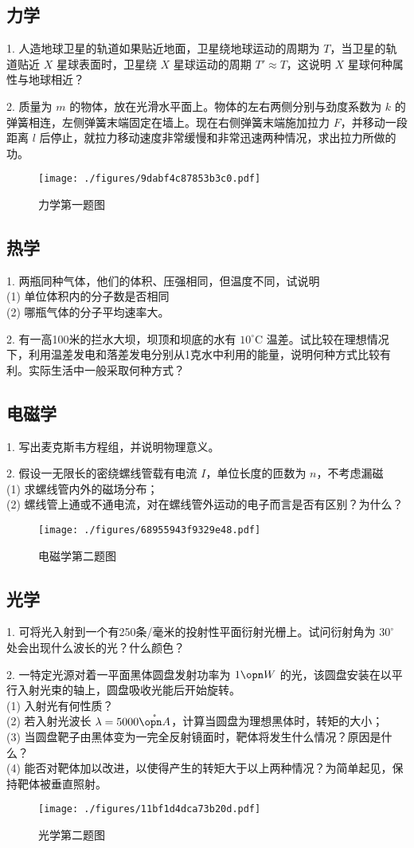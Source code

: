 \subsection{力学}
1. 人造地球卫星的轨道如果贴近地面，卫星绕地球运动的周期为 $T$，当卫星的轨道贴近 $X$ 星球表面时，卫星绕 $X$ 星球运动的周期 $T' \approx T$，这说明 $X$ 星球何种属性与地球相近？

2. 质量为 $m$ 的物体，放在光滑水平面上。物体的左右两侧分别与劲度系数为 $k$ 的弹簧相连，左侧弹簧末端固定在墙上。现在右侧弹簧末端施加拉力 $F$，并移动一段距离 $l$ 后停止，就拉力移动速度非常缓慢和非常迅速两种情况，求出拉力所做的功。
\begin{figure}[ht]
\centering
\texttt{[image: ./figures/9dabf4c87853b3c0.pdf]}
\caption{力学第一题图} \label{fig_NJU13_1}
\end{figure}
\subsection{热学}
1. 两瓶同种气体，他们的体积、压强相同，但温度不同，试说明\\
(1) 单位体积内的分子数是否相同\\
(2) 哪瓶气体的分子平均速率大。

2. 有一高100米的拦水大坝，坝顶和坝底的水有 $10^\circ\mathrm{C}$ 温差。试比较在理想情况下，利用温差发电和落差发电分别从1克水中利用的能量，说明何种方式比较有利。实际生活中一般采取何种方式？
\subsection{电磁学}
1. 写出麦克斯韦方程组，并说明物理意义。

2. 假设一无限长的密绕螺线管载有电流 $I$，单位长度的匝数为 $n$，不考虑漏磁\\
(1) 求螺线管内外的磁场分布；\\
(2) 螺线管上通或不通电流，对在螺线管外运动的电子而言是否有区别？为什么？
\begin{figure}[ht]
\centering
\texttt{[image: ./figures/68955943f9329e48.pdf]}
\caption{电磁学第二题图} \label{fig_NJU13_2}
\end{figure}
\subsection{光学}
1. 可将光入射到一个有250条/毫米的投射性平面衍射光栅上。试问衍射角为 $30^\circ$ 处会出现什么波长的光？什么颜色？

2. 一特定光源对着一平面黑体圆盘发射功率为 $1\opn W$ 的光，该圆盘安装在以平行入射光束的轴上，圆盘吸收光能后开始旋转。\\
(1) 入射光有何性质？\\
(2) 若入射光波长 $\lambda=5000 \mathring{\opn A}$，计算当圆盘为理想黑体时，转矩的大小；\\
(3) 当圆盘靶子由黑体变为一完全反射镜面时，靶体将发生什么情况？原因是什么？\\
(4) 能否对靶体加以改进，以使得产生的转矩大于以上两种情况？为简单起见，保持靶体被垂直照射。
\begin{figure}[ht]
\centering
\texttt{[image: ./figures/11bf1d4dca73b20d.pdf]}
\caption{光学第二题图} \label{fig_NJU13_3}
\end{figure}
